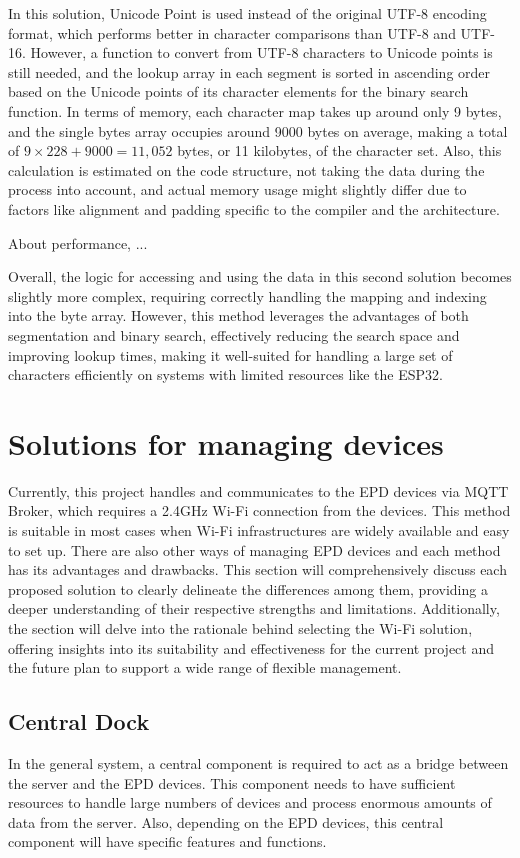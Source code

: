 \documentclass[../Main.tex]{subfiles}
\begin{document}
In this solution, Unicode Point is used instead of the original UTF-8 encoding format, which performs better in character comparisons than UTF-8 and UTF-16. However, a function to convert from UTF-8 characters to Unicode points is still needed, and the lookup array in each segment is sorted in ascending order based on the Unicode points of its character elements for the binary search function. In terms of memory, each character map takes up around only 9 bytes, and the single bytes array occupies around 9000 bytes on average, making a total of \(9\times228+9000=11,052\) bytes, or 11 kilobytes, of the character set. Also, this calculation is estimated on the code structure, not taking the data during the process into account, and actual memory usage might slightly differ due to factors like alignment and padding specific to the compiler and the architecture.

About performance, ...

Overall, the logic for accessing and using the data in this second solution becomes slightly more complex, requiring correctly handling the mapping and indexing into the byte array. However, this method leverages the advantages of both segmentation and binary search, effectively reducing the search space and improving lookup times, making it well-suited for handling a large set of characters efficiently on systems with limited resources like the ESP32.

\section{Solutions for managing devices}
Currently, this project handles and communicates to the EPD devices via MQTT Broker, which requires a 2.4GHz Wi-Fi connection from the devices. This method is suitable in most cases when Wi-Fi infrastructures are widely available and easy to set up. There are also other ways of managing EPD devices and each method has its advantages and drawbacks. This section will comprehensively discuss each proposed solution to clearly delineate the differences among them, providing a deeper understanding of their respective strengths and limitations. Additionally, the section will delve into the rationale behind selecting the Wi-Fi solution, offering insights into its suitability and effectiveness for the current project and the future plan to support a wide range of flexible management.

\subsection{Central Dock}
In the general system, a central component is required to act as a bridge between the server and the EPD devices. This component needs to have sufficient resources to handle large numbers of devices and process enormous amounts of data from the server. Also, depending on the EPD devices, this central component will have specific features and functions.
\end{document}
